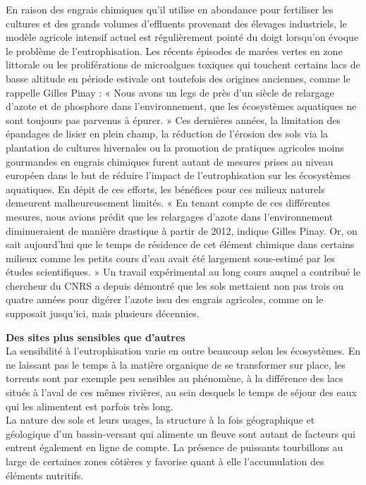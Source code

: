 \documentclass[8pt]{article}
\begin{document}
En raison des engrais chimiques qu’il utilise en abondance pour fertiliser les cultures et des grands volumes d’effluents provenant des élevages industriels, le modèle agricole intensif actuel est régulièrement pointé du doigt lorsqu’on évoque le problème de l’eutrophisation. Les récents épisodes de marées vertes en zone littorale ou les proliférations de microalgues toxiques qui touchent certains lacs de basse altitude en période estivale ont toutefois des origines anciennes, comme le rappelle Gilles Pinay : « Nous avons un legs de près d’un siècle de relargage d’azote et de phosphore dans l’environnement, que les écosystèmes aquatiques ne sont toujours pas parvenus à épurer. » Ces dernières années, la limitation des épandages de lisier en plein champ, la réduction de l’érosion des sols via la plantation de cultures hivernales ou la promotion de pratiques agricoles moins gourmandes en engrais chimiques furent autant de mesures prises au niveau européen dans le but de réduire l’impact de l’eutrophisation sur les écosystèmes aquatiques. En dépit de ces efforts, les bénéfices pour ces milieux naturels demeurent malheureusement limités. « En tenant compte de ces différentes mesures, nous avions prédit que les relargages d’azote dans l’environnement diminueraient de manière drastique à partir de 2012, indique Gilles Pinay. Or, on sait aujourd’hui que le temps de résidence de cet élément chimique dans certains milieux comme les petits cours d’eau avait été largement sous-estimé par les études scientifiques. » Un travail expérimental au long cours auquel a contribué le chercheur du CNRS a depuis démontré que les sols mettaient non pas trois ou quatre années pour digérer l’azote issu des engrais agricoles, comme on le supposait jusqu’ici, mais plusieurs décennies.

\textbf{Des sites plus sensibles que d’autres}\\

La sensibilité à l’eutrophisation varie en outre beaucoup selon les écosystèmes. En ne laissant pas le temps à la matière organique de se transformer sur place, les torrents sont par exemple peu sensibles au phénomène, à la différence des lacs situés à l’aval de ces mêmes rivières, au sein desquels le temps de séjour des eaux qui les alimentent est parfois très long.\\

La nature des sols et leurs usages, la structure à la fois géographique et géologique d’un bassin-versant qui alimente un fleuve sont autant de facteurs qui entrent également en ligne de compte. La présence de puissants tourbillons au large de certaines zones côtières y favorise quant à elle l’accumulation des éléments nutritifs.\\
\end{document}
